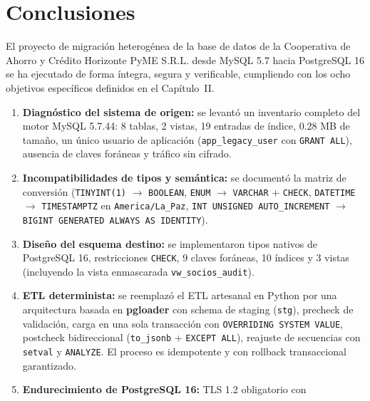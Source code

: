 
\section{Conclusiones}

El proyecto de migración heterogénea de la base de datos de la Cooperativa de
Ahorro y Crédito Horizonte PyME S.R.L. desde MySQL 5.7 hacia PostgreSQL 16 se
ha ejecutado de forma íntegra, segura y verificable, cumpliendo con los ocho
objetivos específicos definidos en el Capítulo~II.

\begin{enumerate}
  \item \textbf{Diagnóstico del sistema de origen:} se levantó un inventario
        completo del motor MySQL 5.7.44: 8 tablas, 2 vistas, 19 entradas de
        índice, 0.28 MB de tamaño, un único usuario de aplicación
        (\texttt{app\_legacy\_user} con \texttt{GRANT ALL}), ausencia de claves
        foráneas y tráfico sin cifrado.
  \item \textbf{Incompatibilidades de tipos y semántica:} se documentó la matriz
        de conversión (\texttt{TINYINT(1)} $\rightarrow$ \texttt{BOOLEAN},
        \texttt{ENUM} $\rightarrow$ \texttt{VARCHAR} + \texttt{CHECK},
        \texttt{DATETIME} $\rightarrow$ \texttt{TIMESTAMPTZ} en
        \texttt{America/La\_Paz}, \texttt{INT UNSIGNED AUTO\_INCREMENT}
        $\rightarrow$ \texttt{BIGINT GENERATED ALWAYS AS IDENTITY}).
  \item \textbf{Diseño del esquema destino:} se implementaron tipos nativos de
        PostgreSQL 16, restricciones \texttt{CHECK}, 9 claves foráneas, 10
        índices y 3 vistas (incluyendo la vista enmascarada
        \texttt{vw\_socios\_audit}).
  \item \textbf{ETL determinista:} se reemplazó el ETL artesanal en Python por
        una arquitectura basada en \textbf{pgloader} con schema de staging
        (\texttt{stg}), precheck de validación, carga en una sola transacción con
        \texttt{OVERRIDING SYSTEM VALUE}, postcheck bidireccional
        (\texttt{to\_jsonb} + \texttt{EXCEPT ALL}), reajuste de secuencias con
        \texttt{setval} y \texttt{ANALYZE}. El proceso es idempotente y con
        rollback transaccional garantizado.
  \item \textbf{Endurecimiento de PostgreSQL 16:} TLS 1.2 obligatorio con

\end{enumerate}
